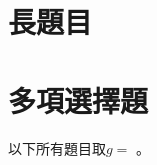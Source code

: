 \documentclass[class=exam, crop=false]{standalone}
\begin{document}
\setlength{\tabcolsep}{10pt}

\section{長題目}
\begin{questions}
    \ansdisplay
    \foreachproblem[lq]{
        \question \thisproblem \clearpage
    }
\end{questions}

\section{多項選擇題}
以下所有題目取$g=$ 。
\begin{questions}
    \ansdisplay

    \foreachproblem[mc]{
        \filbreak\question\thisproblem
    }
\end{questions}



\end{document}

